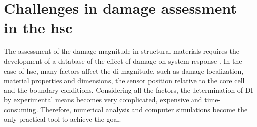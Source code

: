 \section{Challenges in damage assessment in the \acs{hsc}}
\label{sec:challenges}

The assessment of the damage magnitude in structural materials requires the development of a database of the effect of damage on system response \cite{worden2007fundamental}.
In the case of \ac{hsc}, many factors affect the \ac{di} magnitude, such as damage localization, material properties and dimensions, the sensor position relative to the core cell and the boundary conditions.
Considering all the factors, the determination of DI by experimental means becomes very complicated, expensive and time-consuming.
Therefore, numerical analysis and computer simulations become the only practical tool to achieve the goal.

